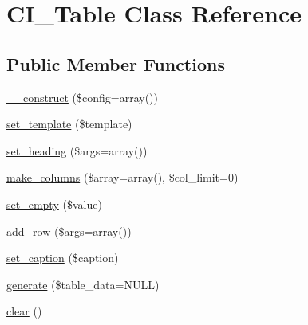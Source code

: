 \hypertarget{class_c_i___table}{}\section{C\+I\+\_\+\+Table Class Reference}
\label{class_c_i___table}
\subsection*{Public Member Functions}
\begin{DoxyCompactItemize}
\item 
\mbox{\hyperlink{class_c_i___table_aafb01706a8d4082ff7fbf35b3efae4d5}{\+\_\+\+\_\+construct}} (\$config=array())
\item 
\mbox{\hyperlink{class_c_i___table_a2dd144ee26a9abb20dbf71555716d2d4}{set\+\_\+template}} (\$template)
\item 
\mbox{\hyperlink{class_c_i___table_afdb7990fbfa5d83acfc1272829209ca7}{set\+\_\+heading}} (\$args=array())
\item 
\mbox{\hyperlink{class_c_i___table_a3d779b75cf9599b02372de83b68819ad}{make\+\_\+columns}} (\$array=array(), \$col\+\_\+limit=0)
\item 
\mbox{\hyperlink{class_c_i___table_a0cf2d8b62a5dc9f080690fb9655846f5}{set\+\_\+empty}} (\$value)
\item 
\mbox{\hyperlink{class_c_i___table_a955fc013a1e13834dea84b4cfdf6f2a5}{add\+\_\+row}} (\$args=array())
\item 
\mbox{\hyperlink{class_c_i___table_a392d4ca789546f2a09104895d9f8ca0b}{set\+\_\+caption}} (\$caption)
\item 
\mbox{\hyperlink{class_c_i___table_af165170829d4e6622bc2322c56d21e00}{generate}} (\$table\+\_\+data=N\+U\+LL)
\item 
\mbox{\hyperlink{class_c_i___table_af452779692cfae6de332f1f697170445}{clear}} ()
\end{DoxyCompactItemize}
